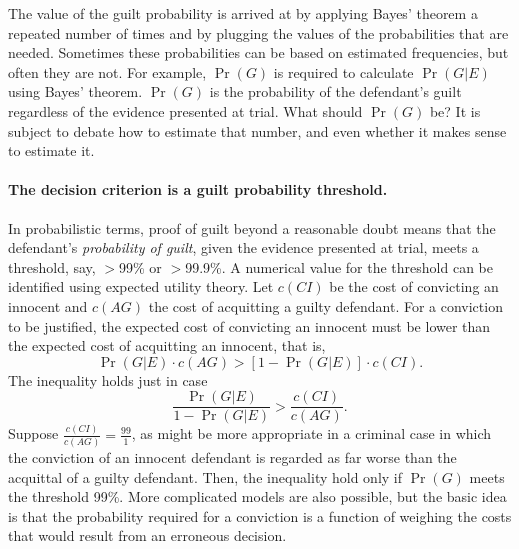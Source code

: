 \documentclass[10pt]{article}
\begin{document}
The value of the guilt probability is arrived at by applying Bayes' theorem a 
repeated number of times and by plugging the values of the probabilities that are needed. 
Sometimes these probabilities can be %
based on estimated frequencies, but often %
they are not. For example, $\Pr(G)$ is required to calculate $\Pr(G|E)$ using Bayes' theorem. 
$\Pr(G)$ is the probability of the defendant's guilt regardless of the evidence 
presented at trial. What should $\Pr(G)$ be? 
It is subject to debate how to estimate that number, and even whether it makes sense to estimate it.


\paragraph{The decision criterion is a guilt probability threshold.}

In probabilistic terms, proof of guilt beyond a reasonable doubt means 
that the defendant's \textit{probability of guilt}, given the evidence presented at trial, meets a 
threshold, say, $>$99\% or $>$99.9\%. 
%
A numerical value for the threshold can be identified using expected utility theory. 
Let $c(CI)$ be the cost of convicting an innocent and $c(AG)$ the cost 
of acquitting a guilty defendant. For a conviction to be justified, the 
expected cost of convicting an innocent must be lower than the expected 
cost of acquitting an innocent, that is, 
%
\[ \Pr(G|E) \cdot c(AG) > [1-\Pr(G|E)] \cdot c(CI) .\]
%
The inequality holds just in case 
%
\[ \frac{\Pr(G|E)}{1- \Pr(G|E)} > \frac{c(CI)}{c(AG)}.\]
%
Suppose $ \frac{c(CI)}{c(AG)}=\frac{99}{1}$, as might be more appropriate in a criminal 
case in which the conviction of an innocent defendant is regarded as far worse than the acquittal of a guilty defendant.
Then, the inequality hold only if $\Pr(G)$ meets the threshold 99\%.
More complicated models are also possible, but the basic idea is that the probability 
required for a conviction is a function of weighing the 
costs that would result from an erroneous decision. 
\end{document}
